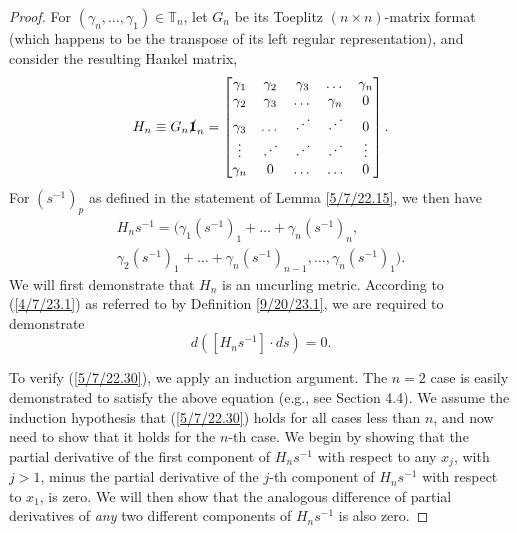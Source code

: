 \documentclass{amsart}
\numberwithin{equation}{section}
\theoremstyle{definition}
\numberwithin{theorem}{section}
\begin{document}
\begin{proof}  For $(\gamma_n,\dots,\gamma_1)\in \mathbb{T}_n$, let $G_n$ be its Toeplitz $(n\times n)$-matrix format (which happens to be the transpose of its left regular representation), and consider the resulting Hankel matrix, 
\begin{equation}\label{5/7/22.20} H_n \equiv G_n \slashed{\bf 1}_n = \begin{bmatrix} \gamma_1 & \gamma_2 & \gamma_3 & \dots & \gamma_n \\ \gamma_2 & \gamma_3 & \dots & \gamma_n & 0 \\ \gamma_3 & \dots & \iddots & \iddots & 0  \\ \vdots & \iddots & \iddots & \iddots & \vdots \\ \gamma_n & 0 & \dots & \ldots & 0 \end{bmatrix}.\end{equation}
For $\left( s^{-1} \right)_p$ as defined in the statement of Lemma \ref{5/7/22.15}, we then have
\begin{multline}  H_n s^{-1}   =  \Big( \gamma_1\left( s^{-1} \right)_1  + \dots + \gamma_n \left( s^{-1} \right)_n, \\ \gamma_2\left( s^{-1} \right)_1  + \dots + \gamma_n \left( s^{-1} \right)_{n-1}, 
  \dots , 
 \gamma_n \left( s^{-1} \right)_1 \Big). \label{5/7/22.40}
\end{multline}
 We will first demonstrate that $H_n$ is an uncurling metric.  According to (\ref{4/7/23.1}) as referred to by Definition \ref{9/20/23.1}, we are required to demonstrate 
\begin{equation}\label{5/7/22.30} d\left([H_n s^{-1}]\cdot ds\right) = 0.\end{equation}  

To verify (\ref{5/7/22.30}), we apply an induction argument.  The $n=2$ case is easily demonstrated to satisfy the above equation (e.g., see Section 4.4).  We assume the induction hypothesis that (\ref{5/7/22.30}) holds for all cases less than $n$, and now need to show that it holds for the $n$-th case.  
We begin by showing that the partial derivative of the first component of $H_n s^{-1}$ with respect to any $x_j$, with $j>1$, minus the partial derivative of the $j$-th component of $H_n s^{-1}$ with respect to $x_1$, is zero. We will then show that the analogous difference of partial derivatives of {\it any} two different components of $H_ns^{-1}$ is also zero.


\end{proof}
\end{document}
